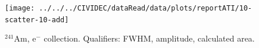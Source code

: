 %
%
%
%
%
%


\clearpage
\begin{figure}[]
\centering
\texttt{[image: ../../../CIVIDEC/dataRead/data/plots/reportATI/10-scatter-10-add]}
\caption{$^{241}$Am, e$^{-}$ collection. Qualifiers: FWHM, amplitude, calculated area.}
\label{fig:scatterae}
\end{figure}


\clearpage
